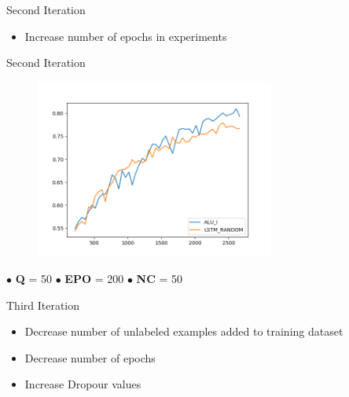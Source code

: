 \documentclass[10pt]{beamer}
\begin{document}
\begin{frame}[fragile]{Second Iteration}
\begin{itemize}
    \item Increase number of epochs in experiments
\end{itemize}
\end{frame}

\begin{frame}[fragile]{Second Iteration}
\begin{figure}[H]
    \centering
    \includegraphics[width=0.7\textwidth]{images/acl_n200_comparison}
\end{figure}

\hspace{1.5cm} $\bullet$ \textbf{Q} = 50 \hspace{1cm} $\bullet$ \textbf{EPO} = 200 \hspace{1cm} $\bullet$ \textbf{NC} = 50
\end{frame}

\begin{frame}[fragile]{Third Iteration}
\begin{itemize}
    \item Decrease number of unlabeled examples added to training dataset
    \item Decrease number of epochs
    \item Increase Dropour values
\end{itemize}
\end{frame}
\end{document}
